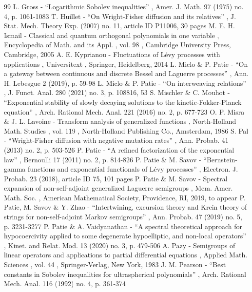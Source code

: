 \documentclass[11pt]{article}
\numberwithin{equation}{section}
\theoremstyle{plain}
\theoremstyle{definition}
\begin{document}
\begin{thebibliography}{99}
 L. Gross - “Logarithmic Sobolev inequalities” , Amer. J. Math. 97 (1975) no. 4, p. 1061-1083
 T. Huillet - “On Wright-Fisher diffusion and its relatives” , J. Stat. Mech. Theory Exp. (2007) no. 11, article ID P11006, 30 pages
 M. E. H. Ismail - Classical and quantum orthogonal polynomials in one variable , Encyclopedia of Math. and its Appl. , vol. 98 , Cambridge University Press, Cambridge, 2005
 A. E. Kyprianou - Fluctuations of Lévy processes with applications , Universitext , Springer, Heidelberg, 2014
 L. Miclo \& P. Patie - “On a gateway between continuous and discrete Bessel and Laguerre processes” , Ann. H. Lebesgue 2 (2019), p. 59-98
 L. Miclo \& P. Patie - “On interweaving relations” , J. Funct. Anal. 280 (2021) no. 3, p. 108816, 53
 S. Mischler \& C. Mouhot - “Exponential stability of slowly decaying solutions to the kinetic-Fokker-Planck equation” , Arch. Rational Mech. Anal. 221 (2016) no. 2, p. 677-723
 O. P. Misra \& J. L. Lavoine - Transform analysis of generalized functions , North-Holland Math. Studies , vol. 119 , North-Holland Publishing Co., Amsterdam, 1986
 S. Pal - “Wright-Fisher diffusion with negative mutation rates” , Ann. Probab. 41 (2013) no. 2, p. 503-526
 P. Patie - “A refined factorization of the exponential law” , Bernoulli 17 (2011) no. 2, p. 814-826
 P. Patie \& M. Savov - “Bernstein-gamma functions and exponential functionals of Lévy processes” , Electron. J. Probab. 23 (2018), article ID 75, 101 pages
 P. Patie \& M. Savov - Spectral expansion of non-self-adjoint generalized Laguerre semigroups , Mem. Amer. Math. Soc. , American Mathematical Society, Providence, RI, 2019, to appear
 P. Patie, M. Savov \& Y. Zhao - “Intertwining, excursion theory and Krein theory of strings for non-self-adjoint Markov semigroups” , Ann. Probab. 47 (2019) no. 5, p. 3231-3277
 P. Patie \& A. Vaidyanathan - “A spectral theoretical approach for hypocoercivity applied to some degenerate hypoelliptic, and non-local operators” , Kinet. and Relat. Mod. 13 (2020) no. 3, p. 479-506
 A. Pazy - Semigroups of linear operators and applications to partial differential equations , Applied Math. Sciences , vol. 44 , Springer-Verlag, New York, 1983
 J. M. Pearson - “Best constants in Sobolev inequalities for ultraspherical polynomials” , Arch. Rational Mech. Anal. 116 (1992) no. 4, p. 361-374

\end{thebibliography}
\end{document}
